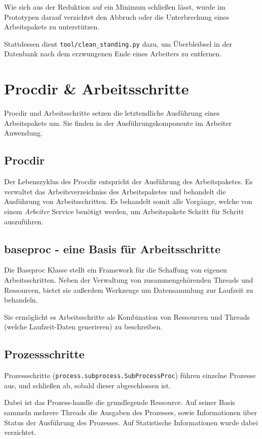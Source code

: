 Wie sich aus der Reduktion auf ein Minimum schließen lässt,
wurde im Prototypen darauf verzichtet den Abbruch oder die Unterbrechung
eines Arbeitspakets zu unterstützen.

Stattdessen dient \verb|tool/clean_standing.py| dazu,
um Überbleibsel in der Datenbank nach dem erzwungenen Ende
eines Arbeiters zu entfernen.



\section{Procdir \& Arbeitsschritte}

Procdir und Arbeitsschritte setzen die letztendliche Ausführung eines Arbeitspakets um.
Sie finden in der Ausführungskomponente im Arbeiter Anwendung.


\subsection{Procdir}

Der Lebenszyklus des Procdir entspricht der Ausführung des Arbeitspaketes.
Es verwaltet das Arbeitsverzeichniss des Arbeitspaketes und behandelt die Ausführung von Arbeitsschritten.
Es behandelt somit alle Vorgänge, welche von einem \emph{Arbeiter} Service benötigt werden, um  Arbeitspakete Schritt für Schritt auszuführen.

\subsection{baseproc - eine Basis für Arbeitsschritte}

Die Baseproc Klasse stellt ein Framework für die Schaffung von eigenen Arbeitsschritten.
Neben der Verwaltung von zusammengehörenden Threads und Ressourcen, bietet sie außerdem Werkzeuge um Datensammlung zur Laufzeit zu behandeln.

Sie ermöglicht es Arbeitsschritte als Kombination von Ressourcen und Threads (welche Laufzeit-Daten generieren) zu beschreiben.


\subsection{Prozessschritte}

Prozessschritte (\verb|process.subprocess.SubProcessProc|)
führen einzelne Prozesse aus, und schließen ab, sobald dieser
abgeschlossen ist.

Dabei ist das Prozess-handle die grundlegende Ressource.
Auf seiner Basis sammeln mehrere Threads die Ausgaben des Prozesses, sowie Informationen über Status der Ausführung des Prozesses.
Auf Statistische Informationen wurde dabei verzichtet.

